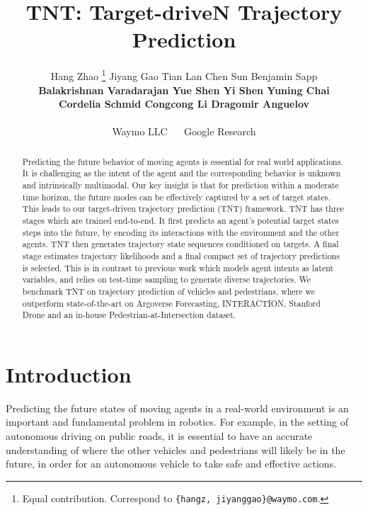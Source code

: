 \documentclass{article}
\title{TNT: Target-driveN Trajectory Prediction}
\author{Hang Zhao \thanks{Equal contribution. Correspond to \texttt{\{hangz, jiyanggao\}@waymo.com}.} \qquad Jiyang Gao \samethanks \qquad Tian Lan \qquad Chen Sun \qquad Benjamin Sapp  \\
  \textbf{Balakrishnan Varadarajan \qquad Yue Shen \qquad Yi Shen \qquad Yuning Chai } \\ 
  \textbf{Cordelia Schmid \qquad Congcong Li \qquad Dragomir Anguelov} \\ \\
Waymo LLC ~~ Google Research
}
\newcommand{\model}{TNT\xspace}
\begin{document}
\maketitle

\vspace{-1em}


\begin{abstract}
Predicting the future behavior of moving agents is essential for real world applications. It is challenging as the intent of the agent and the corresponding behavior is unknown and intrinsically multimodal. Our key insight is that for prediction within a moderate time horizon, the future modes can be effectively captured by a set of target states. 
This leads to our target-driven trajectory prediction (\model) framework. 
\model has three stages which are trained end-to-end. It
first predicts an agent's potential target states  steps into the future, by encoding its interactions with the environment and the other agents. 
\model then generates trajectory state sequences conditioned on targets. A final stage estimates trajectory likelihoods and a final compact set of trajectory predictions is selected.
This is in contrast to previous work which models agent intents as latent variables, and relies on test-time sampling to generate diverse trajectories.
We benchmark \model on trajectory prediction of vehicles and pedestrians, where we outperform state-of-the-art on Argoverse Forecasting, INTERACTION, Stanford Drone and an in-house Pedestrian-at-Intersection dataset.
\end{abstract}

  \section{Introduction}
Predicting the future states of moving agents in a real-world environment is an important and fundamental problem in robotics.
For example, in the setting of autonomous driving on public roads, it is essential to have an accurate understanding of where the other vehicles and pedestrians will likely be in the future, in order for an autonomous vehicle to take safe and effective actions.
\end{document}
